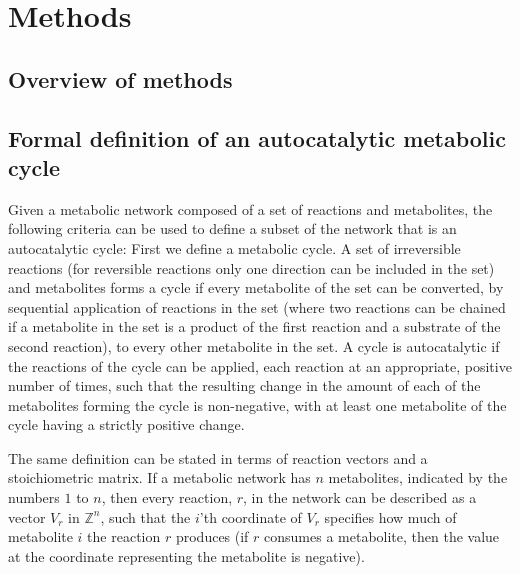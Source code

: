   \section{Methods}
  \subsection*{Overview of methods}
    \renewcommand\thesubsection{\arabic{subsection}}
\renewcommand\stifont{\normalfont\small}
  \secttoc
  \subsection{Formal definition of an autocatalytic metabolic cycle}
  Given a metabolic network composed of a set of reactions and metabolites, the following criteria can be used to define a subset of the network that is an autocatalytic cycle:
  First we define a metabolic cycle.
A set of irreversible reactions (for reversible reactions only one direction can be included in the set) and metabolites forms a cycle if every metabolite of the set can be converted, by sequential application of reactions in the set (where two reactions can be chained if a metabolite in the set is a product of the first reaction and a substrate of the second reaction), to every other metabolite in the set.
A cycle is autocatalytic if the reactions of the cycle can be applied, each reaction at an appropriate, positive number of times, such that the resulting change in the amount of each of the metabolites forming the cycle is non-negative, with at least one metabolite of the cycle having a strictly positive change.

The same definition can be stated in terms of reaction vectors and a stoichiometric matrix.
If a metabolic network has $n$ metabolites, indicated by the numbers $1$ to $n$, then every reaction, $r$, in the network can be described as a vector $V_r$ in $\mathbb{Z}^n$, such that the $i$'th coordinate of $V_r$ specifies how much of metabolite $i$ the reaction $r$ produces (if $r$ consumes a metabolite, then the value at the coordinate representing the metabolite is negative).


